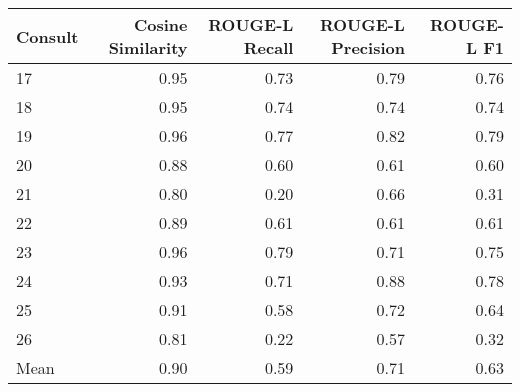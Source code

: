 \begin{tabular}{lrrrr}
\toprule
Consult & Cosine Similarity & ROUGE-L Recall & ROUGE-L Precision & ROUGE-L F1 \\
\midrule
17 & 0.95 & 0.73 & 0.79 & 0.76 \\
18 & 0.95 & 0.74 & 0.74 & 0.74 \\
19 & 0.96 & 0.77 & 0.82 & 0.79 \\
20 & 0.88 & 0.60 & 0.61 & 0.60 \\
21 & 0.80 & 0.20 & 0.66 & 0.31 \\
22 & 0.89 & 0.61 & 0.61 & 0.61 \\
23 & 0.96 & 0.79 & 0.71 & 0.75 \\
24 & 0.93 & 0.71 & 0.88 & 0.78 \\
25 & 0.91 & 0.58 & 0.72 & 0.64 \\
26 & 0.81 & 0.22 & 0.57 & 0.32 \\
Mean & 0.90 & 0.59 & 0.71 & 0.63 \\
\bottomrule
\end{tabular}
